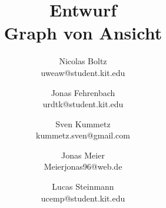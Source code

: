 \documentclass[a4paper]{scrreprt}
\begin{document}
\title{Entwurf\\
Graph von Ansicht}
\date{}
\author{Nicolas Boltz   \\ uweaw@student.kit.edu
  \and Jonas Fehrenbach \\ urdtk@student.kit.edu
  \and Sven Kummetz     \\ kummetz.sven@gmail.com
  \and Jonas Meier      \\ Meierjonas96@web.de
  \and Lucas Steinmann  \\ ucemp@student.kit.edu
}

\titlehead{\texttt{[image: resourcen/GAns.png]}}

\maketitle

{\small\tableofcontents}











\clearpage

%
\end{document}
